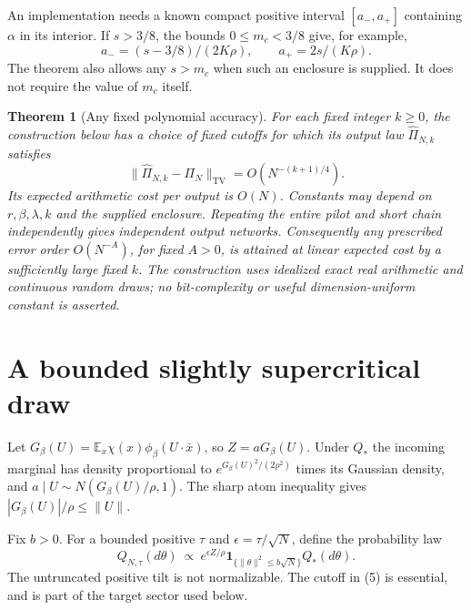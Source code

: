 \documentclass[11pt]{article}
\newtheorem{theorem}{Theorem}\newtheorem{lemma}[theorem]{Lemma}
\newcommand{\E}{\mathbb E}\newcommand{\R}{\mathbb R}
\newcommand{\one}{\mathbf1}\newcommand{\TV}{\mathrm{TV}}
\begin{document}
An implementation needs a known compact positive interval
$[a_-,a_+]$ containing $\alpha$ in its interior. If $s>3/8$, the bounds
$0\le m_c<3/8$ give, for example,
\[
        a_-=(s-3/8)/(2K\rho),\qquad a_+=2s/(K\rho).      \tag{3}
\]
The theorem also allows any $s>m_c$ when such an enclosure is supplied.
It does not require the value of $m_c$ itself.

\begin{theorem}[Any fixed polynomial accuracy]\label{thm:main}
For each fixed integer $k\ge0$, the construction below has a choice of
fixed cutoffs for which its output law $\widehat\Pi_{N,k}$ satisfies
\[
           \|\widehat\Pi_{N,k}-\Pi_N\|_{\TV}
                        =O(N^{-(k+1)/4}).                \tag{4}
\]
Its expected arithmetic cost per output is $O(N)$. Constants may depend
on $r,\beta,\lambda,k$ and the supplied enclosure. Repeating the entire
pilot and short chain independently gives independent output networks.
Consequently any prescribed error order $O(N^{-A})$, for fixed $A>0$,
is attained at linear expected cost by a sufficiently large fixed $k$.
The construction uses idealized exact real arithmetic and continuous
random draws; no bit-complexity or useful dimension-uniform constant is
asserted.
\end{theorem}

\section{A bounded slightly supercritical draw}
Let $G_\beta(U)=\E_x\chi(x)\phi_\beta(U\cdot\bar x)$, so $Z=aG_\beta(U)$.
Under $Q_*$ the incoming marginal has density proportional to
$e^{G_\beta(U)^2/(2\rho^2)}$ times its Gaussian density, and
$a\mid U\sim N(G_\beta(U)/\rho,1)$. The sharp atom inequality gives
$|G_\beta(U)|/\rho\le\|U\|$.

Fix $b>0$. For a bounded positive $\tau$ and
$\epsilon=\tau/\sqrt N$, define the probability law
\[
 Q_{N,\tau}(d\theta)\ \propto\
 e^{\epsilon Z/\rho}\one_{\{\|\theta\|^2\le b\sqrt N\}}Q_*(d\theta).
 \tag{5}
\]
The untruncated positive tilt is not normalizable. The cutoff in (5)
is essential, and is part of the target sector used below.
\end{document}
